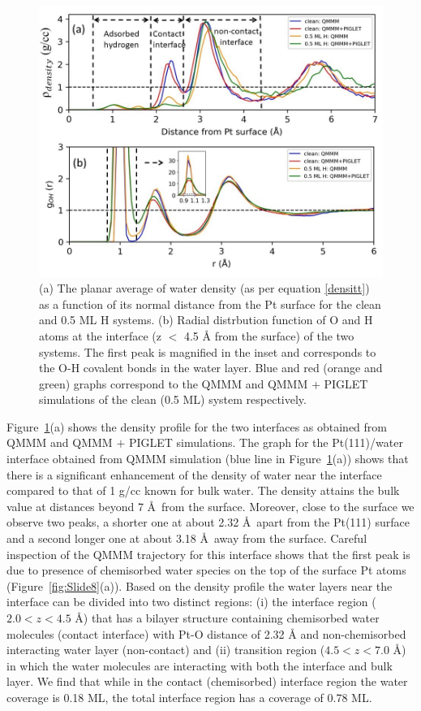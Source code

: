 \begin{figure}
   \begin{center}
    \includegraphics[width=15cm]{./Chapter3/figures/Slide1.JPG}       
   \end{center}
    \caption{(a) The planar average of water density (as per equation \ref{densitt}) as a function of its normal distance from the Pt surface for the clean and 0.5 ML H systems. (b) Radial distrbution function of O and H atoms at the interface (z $<$ 4.5 \AA{} from the surface) of the two systems. The first peak is magnified in the inset and corresponds to the O-H covalent bonds in the water layer. Blue and red (orange and green) graphs correspond to the QMMM and QMMM + PIGLET simulations of the clean (0.5 ML) system respectively.}
  \label{fig:Slide1}
\end{figure}

Figure~\ref{fig:Slide1}(a) shows the density profile for the two
interfaces as obtained from QMMM and QMMM $+$ PIGLET simulations. The graph 
for the Pt(111)/water interface obtained from QMMM simulation (blue line
in Figure~\ref{fig:Slide1}(a)) shows that there is a significant
enhancement of the density of water near the interface compared to that
of 1 g/cc known for bulk water. The density attains the bulk value
at distances beyond 7 \AA~from the surface. Moreover, close to the
surface we observe two peaks, a shorter one at about 2.32 \AA~apart from
the Pt(111) surface and a second longer one at about 3.18 \AA~away from 
the surface. Careful inspection of the QMMM trajectory for this interface
shows that the first peak is due to presence of chemisorbed water
species on the top of the surface Pt atoms (Figure~\ref{fig:Slide8}(a)). Based on the
density profile the water layers near the interface can be
divided into two distinct regions: (i) the interface region ($2.0 < z < 4.5$ \AA) that has a bilayer structure containing chemisorbed water molecules (contact interface) with Pt-O distance of 2.32 \AA{} and non-chemisorbed interacting water layer (non-contact) and (ii) transition region ($4.5<z<7.0$ \AA{}) in which
the water molecules are interacting with both the interface and bulk layer. 
We find that while in the contact (chemisorbed) interface region the water coverage is 0.18 ML, the total interface region has a coverage of 0.78 ML.

